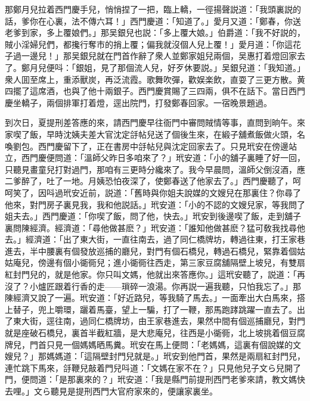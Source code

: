 那鄭月兒拉着西門慶手兒，悄悄捏了一把，臨上轎，一徑揚聲説道：「我頭裏説的話，爹你在心裏，法不傳六耳！」西門慶道：「知道了。」愛月又道：「鄭春，你送老爹到家，多上覆娘們。」那吴銀兒也説：「多上覆大娘。」伯爵道：「我不好説的，賊小淫婦兒們，都攙行奪市的捎上覆；偏我就沒個人兒上覆！」愛月道：「你這花子過一邊兒！」那吴銀兒就在門首作辭了衆人並鄭家姐兒兩個，吴惠打着燈回家去了。鄭月兒便呌：「銀姐，見了那個流人兒，好歹休要説。」吴銀兒道：「我知道。」衆人囬至席上，重添獸炭，再泛流霞。歌舞吹彈，歡娱楽飲，直耍了三更方散。黄四擺了這席酒，也與了他十兩銀子。西門慶賞賜了三四兩，俱不在話下。當日西門慶坐轎子，兩個排軍打着燈，逕出院門，打發鄭春回家。一宿晚景題過。

到次日，夏提刑差答應的來，請西門慶早往衙門中審問賊情等事，直問到晌午。來家喫了飯，早時沈姨夫差大官沈定㧱帖兒送了個後生來，在緞子舖煮飯做火頭，名喚劉包。西門慶留下了，正在書房中㧱帖兒與沈定回家去了。只見玳安在傍邊站立，西門慶便問道：「溫師父昨日多咱來了？」玳安道：「小的舖子裏睡了好一回，只聽見畫童兒打對過門，那咱有三更時分纔來了。我今早晨問，溫師父倒沒酒，應二爹醉了，吐了一地。月姨恐怕夜深了，使鄭春送了他家去了。」西門慶聽了，呵呵笑了，因呌過玳安近前，説道：「舊時與你姐夫說媒的文嫂兒在那裏住？你尋了他來，對門房子裏見我，我和他説話。」玳安道：「小的不認的文嫂兒家，等我問了姐夫去。」西門慶道：「你喫了飯，問了他，快去。」玳安到後邊喫了飯，走到舖子裏問陳經濟。經濟道：「尋他做甚麽？」玳安道：「誰知他做甚麽？猛可敎我找尋他去。」經濟道：「出了東大街，一直往南去，過了同仁橋牌坊，轉過往東，打王家巷進去，半中腰裏有個發放巡捕的廳兒，對門有個石橋兒，轉過石橋兒，緊靠着個姑姑庵兒，傍邊有個小衚衕兒；進小衚衕往西走，第三家豆腐舖隔壁上坡兒，有雙扇紅封門兒的，就是他家。你只叫文媽，他就出來答應你。」這玳安聽了，説道：「再沒了？小爐匠跟着行香的走——瑣碎一浪湯。你再説一遍我聽，只怕我忘了。」那陳經濟又說了一遍。玳安道：「好近路兒，等我騎了馬去。」一面牽出大白馬來，搭上替子，兜上嚼環，躧着馬臺，望上一騙，打了一鞭，那馬跑踍跳躍一直去了。出了東大街，逕往南，過同仁橋牌坊，由王家巷進去，果然中間有個巡捕廳兒，對門就是座破石橋兒，裏首半截紅牆，是大悲庵兒，往西是小衚衕，北上坡挑着個豆腐牌兒，門首只見一個媽媽晒馬糞。玳安在馬上便問：「老媽媽，這裏有個說媒的文嫂兒？」那媽媽道：「這隔壁封門兒就是。」玳安到他門首，果然是兩扇紅封門兒，連忙跳下馬來，㧱鞭兒敲着門兒呌道：「文媽在家不在？」只見他兒子文ら兒開了門，便問道：「是那裏來的？」玳安道：「我是縣門前提刑西門老爹來請，教文媽快去哩。」文ら聽見是提刑西門大官府家來的，便讓家裏坐。

